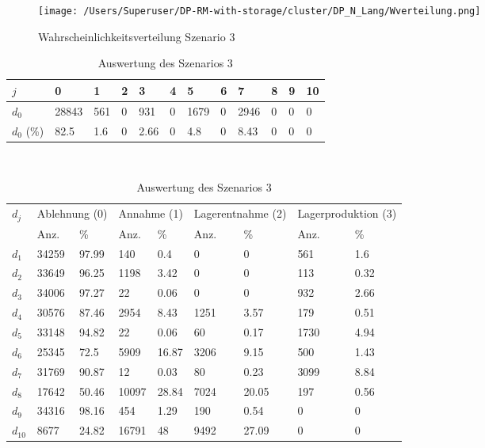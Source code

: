 \begin{figure}[h!]
  \begin{center}
    \texttt{[image: /Users/Superuser/DP-RM-with-storage/cluster/DP\_N\_Lang/Wverteilung.png]}
    \caption{Wahrscheinlichkeitsverteilung Szenario 3}  \label{SB3}
  \end{center}
\end{figure}

\begin{table}[h!]
\renewcommand{\arraystretch}{1.5}
  \begin{center}
    \caption{Auswertung des Szenarios 3}  \label{AS3}
    \vspace*{3mm}
    \begin{tabular}{l l l l l l l l l l l l }  \hline 
         $j$ & 0 & 1  & 2 & 3 & 4  & 5 & 6 & 7 & 8 & 9 & 10  \\  \hline
$d_{0}$ &  28843 &  561 &  0 &   931 &  0 &  1679 &  0 &  2946 &  0 &  0 &  0 \\
$d_{0}$ (\%)&   82.5 &  1.6 &  0 &  2.66 &  0 &   4.8 &  0 &  8.43 &  0 &  0 &  0 \\
\hline
    \end{tabular} \\[3mm]
        \begin{tabular}{ l l l l l l l l l}   \hline    %
    $d_j$ & \multicolumn{2}{c}{Ablehnung (0)} & \multicolumn{2}{c}{Annahme (1)}  & \multicolumn{2}{c}{Lagerentnahme (2)} & \multicolumn{2}{c}{Lagerproduktion (3)}\\
    & Anz. & \% & Anz. & \% & Anz. & \% & Anz. & \% \\ \hline 
$d_{1}$  &  34259 &  97.99 &    140 &    0.4 &   0 &    0 &   561 &   1.6 \\
$d_{2}$  &  33649 &  96.25 &   1198 &   3.42 &   0 &    0 &   113 &  0.32 \\
$d_{3}$  &  34006 &  97.27 &     22 &   0.06 &   0 &    0 &   932 &  2.66 \\
$d_{4}$  &  30576 &  87.46 &   2954 &   8.43 &  1251 &   3.57 &   179 &  0.51 \\
$d_{5}$  &  33148 &  94.82 &     22 &   0.06 &    60 &   0.17 &  1730 &  4.94 \\
$d_{6}$  &  25345 &   72.5 &   5909 &  16.87 &  3206 &   9.15 &   500 &  1.43 \\
$d_{7}$  &  31769 &  90.87 &     12 &   0.03 &    80 &   0.23 &  3099 &  8.84 \\
$d_{8}$  &  17642 &  50.46 &  10097 &  28.84 &  7024 &  20.05 &   197 &  0.56 \\
$d_{9}$  &  34316 &  98.16 &    454 &   1.29 &   190 &   0.54 &   0 &   0 \\
$d_{10}$ &   8677 &  24.82 &  16791 &     48 &  9492 &  27.09 &   0 &   0 \\
          \hline
   \end{tabular} \\[3mm]
     \end{center}
\end{table}


